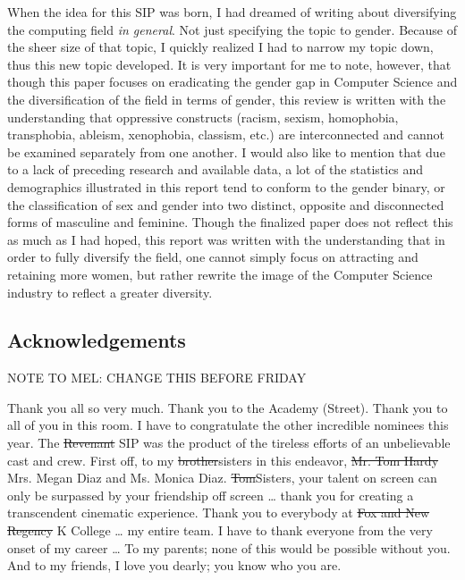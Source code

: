 \documentclass[12pt]{article}
\begin{document}
	
	When the idea for this SIP was born, I had dreamed of writing about diversifying the computing field \textit{in general}. Not just specifying the topic to gender. Because of the sheer size of that topic, I quickly realized I had to narrow my topic down, thus this new topic developed. It is very important for me to note, however, that though this paper focuses on eradicating the gender gap in Computer Science and the diversification of the field in terms of gender, this review is written with the understanding that oppressive constructs (racism, sexism, homophobia, transphobia, ableism, xenophobia, classism, etc.) are interconnected and cannot be examined separately from one another. I would also like to mention that due to a lack of preceding research and available data, a lot of the statistics and demographics illustrated in this report tend to conform to the gender binary, or the classification of sex and gender into two distinct, opposite and disconnected forms of masculine and feminine. Though the finalized paper does not reflect this as much as I had hoped, this report was written with the understanding that in order to fully diversify the field, one cannot simply focus on attracting and retaining more women, but rather rewrite the image of the Computer Science industry to reflect a greater diversity.
	
	\pagebreak
	\subsection{Acknowledgements} 		NOTE TO MEL: CHANGE THIS BEFORE FRIDAY
		
	Thank you all so very much. Thank you to the Academy (Street). Thank you to all of you in this room. I have to congratulate the other incredible nominees this year. The \st{Revenant} SIP was the product of the tireless efforts of an unbelievable cast and crew. First off, to my \st{brother}sisters in this endeavor, \st{Mr. Tom Hardy} Mrs. Megan Diaz and Ms. Monica Diaz. \st{Tom}Sisters, your talent on screen can only be surpassed by your friendship off screen … thank you for creating a transcendent cinematic experience. Thank you to everybody at \st{Fox and New Regency} K College … my entire team. I have to thank everyone from the very onset of my career … To my parents; none of this would be possible without you. And to my friends, I love you dearly; you know who you are.\\
	
\end{document}
